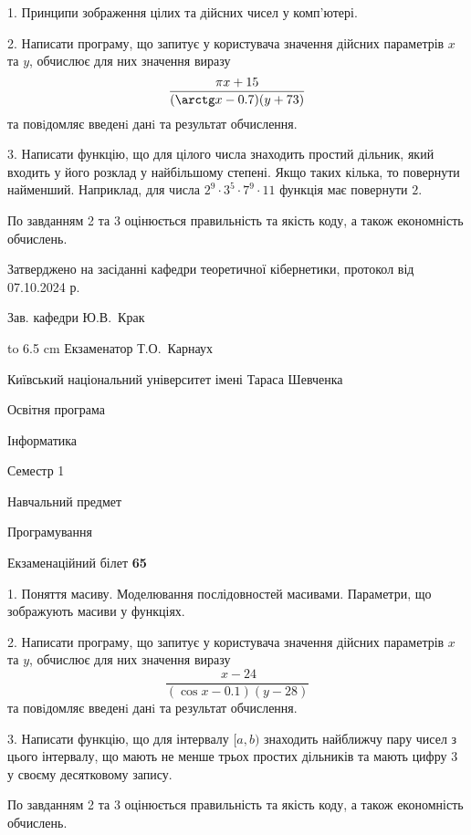 \documentclass[12pt, ukrainian]{article}
\begin{document}
{%
1. Принципи зображення цілих та дійсних чисел у комп'ютері.%
\par
2. Написати програму, що запитує у користувача значення дійсних параметрів $x$ та $y$, обчислює для них значення виразу 
$$\frac{\pi x + 15}{(\arctg x - 0.7) (y + 73)}$$ 
та повiдомляє введенi данi та результат обчислення.

\par
3. Написати функцію, що для цілого числа знаходить простий дільник, який входить у його розклад у найбільшому степені. Якщо таких кілька, то повернути найменший. Наприклад, для числа $2^{9}{\cdot}3^5{\cdot}7^9{\cdot}11$ функція має повернути $2$.

По завданням 2 та 3 оцінюється правильність та якість коду, а також економність обчислень.

}
{\smallskip\smallskip \begin {scriptsize} Затверджено на засіданні кафедри теоретичної кібернетики, протокол   від   07.10.2024 р.\par\smallskip\smallskip\smallskip\smallskip
{\parbox {6.5 cm} {Зав. кафедри \dotfill Ю.В.~Крак}}\hspace {0.7cm} {\hbox to 6.5 cm { Екзаменатор \dotfill Т.О.~Карнаух}} \end{scriptsize}}
\vspace{0.9cm}
{{\begin {scriptsize}\par
{ \center  Київський національний університет імені Тараса Шевченка \par}
{\parbox {5 cm}{Освітня програма \hfill}{\parbox {7 cm}{Інформатика\hfill}}\parbox {6 cm}{\hfill Семестр 1}}\par
{\parbox {5 cm} {Навчальний предмет \hfill}\parbox {7 cm}{Програмування \hfill}\parbox {6cm}{\hfill}\par}\vspace{-15pt} \end{scriptsize}}{\center Екзаменаційний білет \No \textbf { 65 }\par}}
{%
1. Поняття масиву. Моделювання послідовностей масивами. Параметри, що зображують масиви у функціях.%
\par
2. Написати програму, що запитує у користувача значення дійсних параметрів $x$ та $y$, обчислює для них значення виразу 
$$\frac{\ x - 24}{(\cos x - 0.1) (y - 28)}$$ 
та повiдомляє введенi данi та результат обчислення.

\par
3. Написати функцію, що для інтервалу $[a, b)$ знаходить найближчу пару чисел з цього інтервалу, що мають не менше трьох простих дільників та мають цифру 3 у своєму десятковому запису.

По завданням 2 та 3 оцінюється правильність та якість коду, а також економність обчислень.

}
\end{document}
